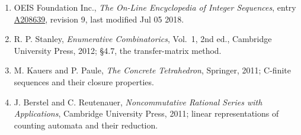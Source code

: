 \documentclass[11pt]{article}
\theoremstyle{definition}
\begin{document}
\begin{enumerate}

\item OEIS Foundation Inc., \emph{The On-Line Encyclopedia of Integer Sequences}, entry \href{https://oeis.org/A208639}{A208639}, revision 9, last modified Jul 05 2018.

\item R. P. Stanley, \emph{Enumerative Combinatorics}, Vol.~1, 2nd ed., Cambridge University Press, 2012; \S4.7, the transfer-matrix method.

\item M. Kauers and P. Paule, \emph{The Concrete Tetrahedron}, Springer, 2011; C-finite sequences and their closure properties.

\item J. Berstel and C. Reutenauer, \emph{Noncommutative Rational Series with Applications}, Cambridge University Press, 2011; linear representations of counting automata and their reduction.

\end{enumerate}
\end{document}
